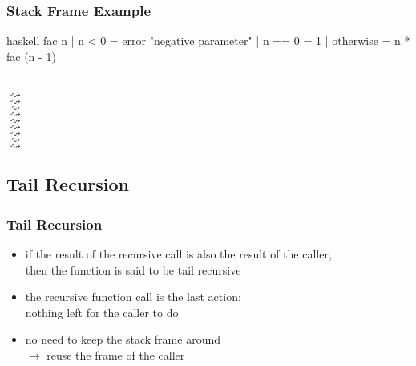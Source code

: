 \documentclass[dvipsnames]{beamer}
\theoremstyle{plain}
\begin{document}
\begin{frame}[fragile]
  \frametitle{Stack Frame Example}

  \begin{exampleblock}{}
    \begin{pygments}{haskell}
fac n
  | n < 0     = error "negative parameter"
  | n == 0    = 1
  | otherwise = n * fac (n - 1)
    \end{pygments}

    \\
    $\rightsquigarrow$ \\
    \hspace{38pt}$\rightsquigarrow$ \\
    \hspace{76pt}$\rightsquigarrow$ \\
    \hspace{114pt}$\rightsquigarrow$ \\
    \hspace{152pt}$\rightsquigarrow$ \\
    \hspace{114pt}$\rightsquigarrow$ \\
    \hspace{76pt}$\rightsquigarrow$ \\
    \hspace{38pt}$\rightsquigarrow$ \\
    $\rightsquigarrow$ \\
  \end{exampleblock}
\end{frame}

\subsection{Tail Recursion}

\begin{frame}
  \frametitle{Tail Recursion}

  \begin{itemize}
    \item if the result of the recursive call is also the result of the caller,\\
      then the function is said to be \alert{tail recursive}
    \item the recursive function call is the last action:\\
      nothing left for the caller to do

    \pause
    \medskip
    \item no need to keep the stack frame around\\
      $\rightarrow$ reuse the frame of the caller
  \end{itemize}
\end{frame}
\end{document}
